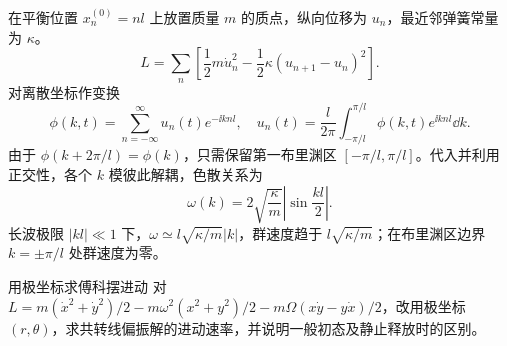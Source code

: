 在平衡位置 $x_n^{(0)}=nl$ 上放置质量 $m$ 的质点，纵向位移为 $u_n$，最近邻弹簧常量为 $\kappa$。
\[
 L=\sum_n\left[\frac12m\dot u_n^2-\frac12\kappa(u_{n+1}-u_n)^2\right].
\]
对离散坐标作变换
\[
 \phi(k,t)=\sum_{n=-\infty}^{\infty}u_n(t)e^{-\ii knl},
 \quad
 u_n(t)=\frac l{2\pi}\int_{-\pi/l}^{\pi/l}
 \phi(k,t)e^{\ii knl}\dd k.
\]
由于 $\phi(k+2\pi/l)=\phi(k)$，只需保留第一布里渊区 $[-\pi/l,\pi/l]$。代入并利用正交性，各个 $k$ 模彼此解耦，色散关系为
\begin{equation}\label{advA1:eq:lattice-dispersion}
 \boxed{\omega(k)=2\sqrt{\frac\kappa m}
 \left|\sin\frac{kl}{2}\right|}.
\end{equation}
长波极限 $|kl|\ll1$ 下，$\omega\simeq l\sqrt{\kappa/m}|k|$，群速度趋于
$l\sqrt{\kappa/m}$；在布里渊区边界 $k=\pm\pi/l$ 处群速度为零。

\begin{advexamplebox}{用极坐标求傅科摆进动}\label{advA1:ex:foucault-polar}
对 $L=m(\dot x^2+\dot y^2)/2-m\omega^2(x^2+y^2)/2-m\Omega(x\dot y-y\dot x)/2$，改用极坐标 $(r,\theta)$，求共转线偏振解的进动速率，并说明一般初态及静止释放时的区别。

\begin{qualityfigure}
\label{advA1:fig:quality-foucault-polar-q}
\end{qualityfigure}
\end{advexamplebox}

